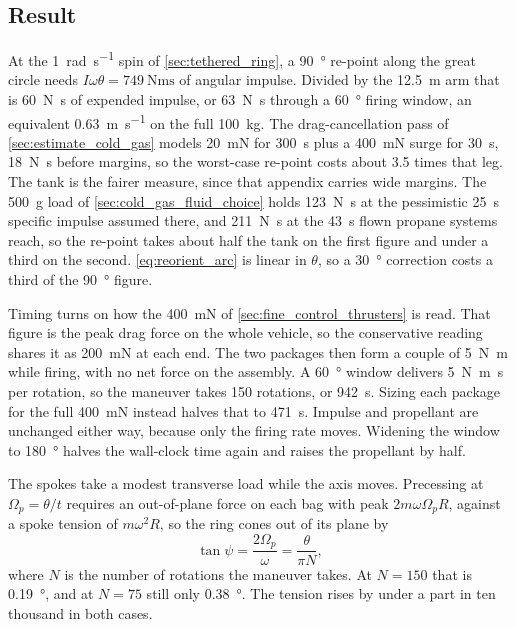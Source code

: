 \documentclass{article}
\begin{document}
\subsection*{Result}
At the \SI{1}{\radian\per\second} spin of \autoref{sec:tethered_ring}, a \SI{90}{\degree} re-point along the great circle needs \(I\omega\theta = \SI{749}{\newton\meter\second}\) of angular impulse. Divided by the \SI{12.5}{\meter} arm that is \SI{60}{\newton\second} of expended impulse, or \SI{63}{\newton\second} through a \SI{60}{\degree} firing window, an equivalent \SI{0.63}{\meter\per\second} on the full \SI{100}{\kilo\gram}. The drag-cancellation pass of \autoref{sec:estimate_cold_gas} models \SI{20}{\milli\newton} for \SI{300}{\second} plus a \SI{400}{\milli\newton} surge for \SI{30}{\second}, \SI{18}{\newton\second} before margins, so the worst-case re-point costs about \num{3.5} times that leg. The tank is the fairer measure, since that appendix carries wide margins. The \SI{500}{\gram} load of \autoref{sec:cold_gas_fluid_choice} holds \SI{123}{\newton\second} at the pessimistic \SI{25}{\second} specific impulse assumed there, and \SI{211}{\newton\second} at the \SI{43}{\second} flown propane systems reach, so the re-point takes about half the tank on the first figure and under a third on the second. \autoref{eq:reorient_arc} is linear in \(\theta\), so a \SI{30}{\degree} correction costs a third of the \SI{90}{\degree} figure.

Timing turns on how the \SI{400}{\milli\newton} of \autoref{sec:fine_control_thrusters} is read. That figure is the peak drag force on the whole vehicle, so the conservative reading shares it as \SI{200}{\milli\newton} at each end. The two packages then form a couple of \SI{5}{\newton\meter} while firing, with no net force on the assembly. A \SI{60}{\degree} window delivers \SI{5}{\newton\meter\second} per rotation, so the maneuver takes 150 rotations, or \SI{942}{\second}. Sizing each package for the full \SI{400}{\milli\newton} instead halves that to \SI{471}{\second}. Impulse and propellant are unchanged either way, because only the firing rate moves. Widening the window to \SI{180}{\degree} halves the wall-clock time again and raises the propellant by half.

The spokes take a modest transverse load while the axis moves. Precessing at \(\Omega_p = \theta/t\) requires an out-of-plane force on each bag with peak \(2 m \omega \Omega_p R\), against a spoke tension of \(m \omega^{2} R\), so the ring cones out of its plane by
\begin{equation}
\tan\psi = \frac{2\Omega_p}{\omega} = \frac{\theta}{\pi N},
\label{eq:reorient_coning}
\end{equation}
where \(N\) is the number of rotations the maneuver takes. At \(N = 150\) that is \SI{0.19}{\degree}, and at \(N = 75\) still only \SI{0.38}{\degree}. The tension rises by under a part in ten thousand in both cases.
\end{document}
